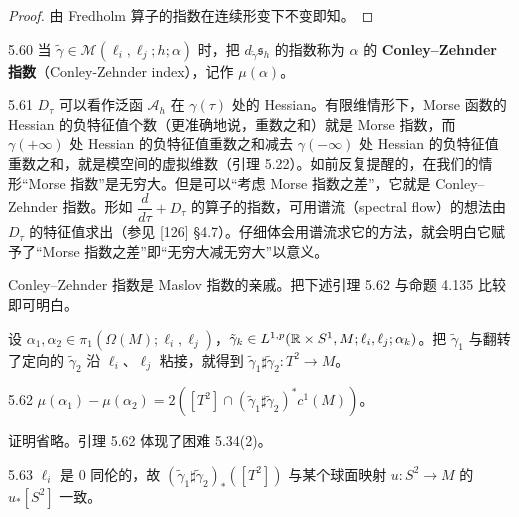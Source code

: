 \begin{proof}
  由 Fredholm 算子的指数在连续形变下不变即知。
\end{proof}

\begin{definition}{5.60}
  当 $\tilde\gamma\in\mathcal{M}(\ell_i,\ell_j;h;\alpha)$ 时，把 $d_{\tilde\gamma}\mathfrak{s}_h$ 的指数称为 $\alpha$ 的 \textbf{Conley–Zehnder 指数}（Conley-Zehnder index），记作 $\mu(\alpha)$。
\end{definition}

\begin{remark}{5.61}
  $D_\tau$ 可以看作泛函 $\mathcal{A}_h$ 在 $\gamma(\tau)$ 处的 Hessian。有限维情形下，Morse 函数的 Hessian 的负特征值个数（更准确地说，重数之和）就是 Morse 指数，而 $\gamma(+\infty)$ 处 Hessian 的负特征值重数之和减去 $\gamma(-\infty)$ 处 Hessian 的负特征值重数之和，就是模空间的虚拟维数（引理 5.22）。如前反复提醒的，在我们的情形“Morse 指数”是无穷大。但是可以“考虑 Morse 指数之差”，它就是 Conley–Zehnder 指数。形如 $\dfrac{d}{d\tau}+D_\tau$ 的算子的指数，可用谱流（spectral flow）的想法由 $D_\tau$ 的特征值求出（参见 [126] §4.7）。仔细体会用谱流求它的方法，就会明白它赋予了“Morse 指数之差”即“无穷大减无穷大”以意义。

  Conley–Zehnder 指数是 Maslov 指数的亲戚。把下述引理 5.62 与命题 4.135 比较即可明白。
\end{remark}

设 $\alpha_1,\alpha_2\in\pi_1(\Omega(M);\ell_i,\ell_j)$，$\tilde\gamma_k\in L^{1,p}(\mathbb{R}\times S^1,M;\ell_i,\ell_j;\alpha_k)$。把 $\tilde\gamma_1$ 与翻转了定向的 $\tilde\gamma_2$ 沿 $\ell_i$、$\ell_j$ 粘接，就得到 $\tilde\gamma_1\sharp\tilde\gamma_2\colon T^2\to M$。

\begin{lemma}{5.62}
  $\mu(\alpha_1)-\mu(\alpha_2)=2([T^2]\cap(\tilde\gamma_1\sharp\tilde\gamma_2)^*c^1(M))$。
\end{lemma}

证明省略。引理 5.62 体现了困难 5.34(2)。


\begin{remark}{5.63}
  $\ell_i$ 是 0 同伦的，故 $(\tilde\gamma_1\sharp\tilde\gamma_2)_*([T^2])$ 与某个球面映射 $u\colon S^2\to M$ 的 $u_*[S^2]$ 一致。
\end{remark}

